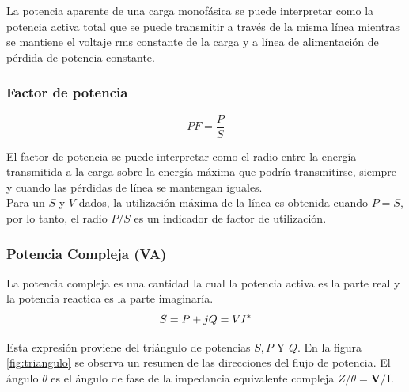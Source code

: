La potencia aparente de una carga monofásica se puede interpretar como la potencia activa total que se puede transmitir a través de la misma línea mientras se mantiene el voltaje rms constante de la carga y a línea de alimentación  de pérdida de potencia constante.\cite{A30}\\

\subsubsection{Factor de potencia}

\begin{equation}\label{EQ20}
PF=\frac{P}{S}
\end{equation}

El factor de potencia se puede interpretar como el radio entre la energía transmitida a la carga sobre la energía máxima que podría transmitirse, siempre y cuando las pérdidas de línea se mantengan iguales.\cite{A30}\\

Para un $S$ y $V$ dados, la utilización máxima de la línea es obtenida cuando $P=S$, por lo tanto, el radio $P/S$ es un indicador de factor de utilización.\cite{A30}\\
 \subsubsection{Potencia Compleja (VA)}
 
 La potencia compleja es una cantidad la cual la potencia activa es la parte real y la potencia reactica es la parte imaginaría.\cite{A30}\\
 
 \begin{equation}\label{EQ21}
 S = P+jQ =  VI^*\\
\end{equation}  

Esta expresión proviene del triángulo de potencias $S,P$ Y $Q$. En la figura \ref{fig:triangulo} se observa un resumen de las direcciones del flujo de potencia. El ángulo $\theta$ es el ángulo de fase de la impedancia equivalente compleja $Z/ \theta = \textbf{V/I}$.\cite{A30}\\ 

